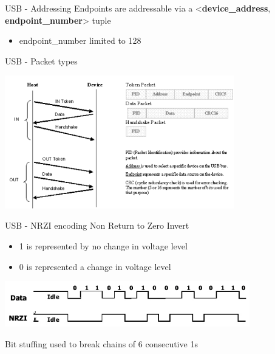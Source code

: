\begin{frame}{USB - Addressing}
  Endpoints are addressable via a <\textbf{device\_address}, \textbf{endpoint\_number}> tuple
  \begin{itemize}
  \item endpoint\_number limited to 128
  \end{itemize}
\end{frame}

\begin{frame}{USB - Packet types}
  \begin{center}
    \includegraphics[width=0.75\textwidth]{figures/usb_packet.png}
  \end{center}
\end{frame}

\begin{frame}{USB - NRZI encoding}
  Non Return to Zero Invert
  \begin{itemize}
  \item 1 is represented by no change in voltage level
  \item 0 is represented a change in voltage level
  \end{itemize}

  \smallskip
  \begin{center}
    \includegraphics[width=0.8\textwidth]{figures/usb_nrzi.jpg}
  \end{center}

  Bit stuffing used to break chains of 6 consecutive 1s

\end{frame}

